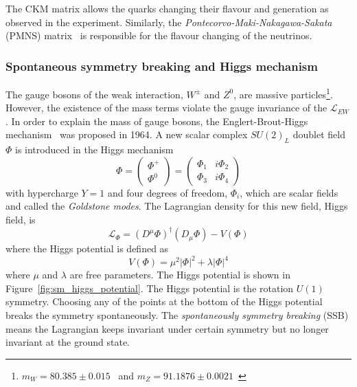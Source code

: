 %
The CKM matrix allows the quarks changing their flavour and generation as observed in the experiment.
Similarly, the \textit{Pontecorvo-Maki-Nakagawa-Sakata} (PMNS) matrix~\cite{PTP.28.870} is responsible for the flavour changing of the neutrinos.


\subsubsection{Spontaneous symmetry breaking and Higgs mechanism}
\label{subsubsec:sm_Higgs_mechanism}
The gauge bosons of the weak interaction, $W^{\pm}$ and $Z^{0}$, are massive particles\footnote{$m_{W}=80.385 \pm 0.015$~{\GeV} and $m_{Z}=91.1876 \pm 0.0021$~{\GeV}}.
However, the existence of the mass terms violate the gauge invariance of the $\mathcal{L}_{EW}$.
In order to explain the mass of gauge bosons, the Englert-Brout-Higgs mechanism~\cite{PhysRev.145.1156,PhysRevLett.13.508,PhysLett.12.132,PhysRevLett.13.321,PhysRevLett.13.585} was proposed in 1964.
A new scalar complex $SU(2)_{L}$ doublet field $\Phi$ is introduced in the Higgs mechanism
%
\begin{equation}
\Phi = \left(\begin{matrix}\Phi^{+}\\\Phi^{0}\end{matrix}\right) = \left(\begin{matrix}\Phi_{1} & i\Phi_{2}\\\Phi_{3} & i\Phi_{4}\end{matrix}\right)
\label{eq:sm_higgs_doublet}
\end{equation}
%
with hypercharge $Y = 1$ and four degrees of freedom, $\Phi_{i}$, which are scalar fields and called the \textit{Goldstone modes}.
The Lagrangian density for this new field, Higgs field, is
%
\begin{equation}
\mathcal{L}_{\Phi} = (D^{\mu}\Phi)^{\dagger}(D_{\mu}\Phi) - V(\Phi)
\label{eq:sm_higgs_lagrangian}
\end{equation}
%
where the Higgs potential is defined as
%
\begin{equation}
V(\Phi) = \mu^{2}|\Phi|^{2} + \lambda|\Phi|^{4}
\label{eq:sm_higgs_potential}
\end{equation}
%
where $\mu$ and $\lambda$ are free parameters.
The Higgs potential is shown in Figure~\ref{fig:sm_higgs_potential}.
The Higgs potential is the rotation $U(1)$ symmetry.
Choosing any of the points at the bottom of the Higgs potential breaks the symmetry spontaneously.
The \textit{spontaneously symmetry breaking} (SSB) means the Lagrangian keeps invariant under certain symmetry but no longer invariant at the ground state.

